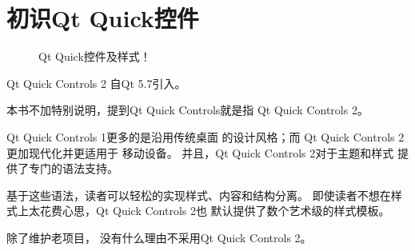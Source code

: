 ﻿




\FloatBarrier
\section{
初识Qt Quick控件
}\label{s100510}


\begin{figure}[htb] %
\marginnote{\setlength\fboxsep{2pt}\fbox{\footnotesize{\kaishu\figurename\,}\footnotesize{\ref{p000007}}}}\centering %
\setlength\fboxsep{0pt} %
\caption{Qt Quick控件及样式！} %
\label{p000007} %
\end{figure}


Qt Quick Controls 2 自Qt 5.7引入。

本书不加特别说明，提到Qt Quick Controls就是指
Qt Quick Controls 2。

Qt Quick Controls 1更多的是沿用传统桌面
的设计风格；而
Qt Quick Controls 2更加现代化并更适用于
移动设备。
并且，Qt Quick Controls 2对于主题和样式
提供了专门的语法支持。

基于这些语法，读者可以轻松的实现样式、内容和结构分离。
即使读者不想在样式上太花费心思，Qt Quick Controls 2也
默认提供了数个艺术级的样式模板。

除了维护老项目，
没有什么理由不采用Qt Quick Controls 2。

